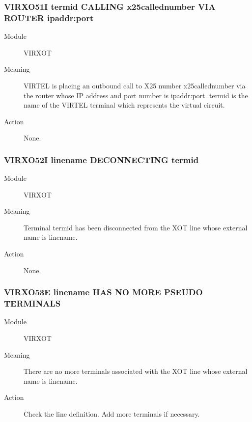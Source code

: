 \documentclass[letterpaper,10pt,english]{sphinxmanual}
\begin{document}
\subsubsection{VIRXO51I termid CALLING x25callednumber VIA ROUTER ipaddr:port}
\label{\detokenize{messages:virxo51i-termid-calling-x25callednumber-via-router-ipaddr-port}}\begin{description}
\item[{Module}] \leavevmode
VIRXOT

\item[{Meaning}] \leavevmode
VIRTEL is placing an outbound call to X25 number x25callednumber via the router whose IP address and port number is ipaddr:port. termid is the name of the VIRTEL terminal which represents the virtual circuit.

\item[{Action}] \leavevmode
None.

\end{description}


\subsubsection{VIRXO52I linename DECONNECTING termid}
\label{\detokenize{messages:virxo52i-linename-deconnecting-termid}}\begin{description}
\item[{Module}] \leavevmode
VIRXOT

\item[{Meaning}] \leavevmode
Terminal termid has been disconnected from the XOT line whose external name is linename.

\item[{Action}] \leavevmode
None.

\end{description}


\subsubsection{VIRXO53E linename HAS NO MORE PSEUDO TERMINALS}
\label{\detokenize{messages:virxo53e-linename-has-no-more-pseudo-terminals}}\begin{description}
\item[{Module}] \leavevmode
VIRXOT

\item[{Meaning}] \leavevmode
There are no more terminals associated with the XOT line whose external name is linename.

\item[{Action}] \leavevmode
Check the line definition. Add more terminals if necessary.

\end{description}
\end{document}
